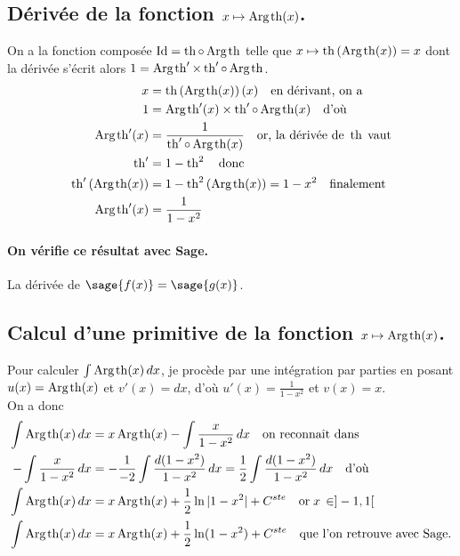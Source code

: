 \documentclass[a4paper,12pt]{report}
\def\Id{\ensuremath{\mathrm{Id}}}
\renewcommand{\tanh}{\mathop{\mathrm{th}}}
\renewcommand{\arg}{\mathop{\mathrm{Arg}}}
\begin{document}
\subsection{Dérivée de la fonction $x \mapsto \arg\mspace{-1mu}\tanh(x)$.}
On a la fonction composée $\Id = \tanh \circ \arg\mspace{-1mu}\tanh$ telle que $x\mapsto\tanh\left(\arg\mspace{-1mu}\tanh(x)\right)=x$ dont la dérivée s'écrit alors $1= \arg\mspace{-1mu}\tanh\nolimits' \times \tanh\nolimits'\circ\arg\mspace{-1mu}\tanh$.
\begin{align*}
x & =\tanh\left(\arg\mspace{-1mu}\tanh(x)\right)(x) \quad \textrm{en dérivant, on a}\\
1 & = \arg\mspace{-1mu}\tanh\nolimits'(x) \times \tanh\nolimits'\circ\arg\mspace{-1mu}\tanh(x) \quad \textrm{d'où}\\
\arg\mspace{-1mu}\tanh\nolimits'(x) & =\frac{1}{ \tanh\nolimits'\circ\arg\mspace{-1mu}\tanh(x)}\quad \textrm{or, la dérivée de } \tanh \; \textrm{vaut}\\
\tanh\nolimits' & = 1-\tanh\nolimits^2 \quad \textrm{donc} \\
\tanh\nolimits'\left(\arg\mspace{-1mu}\tanh(x)\right) & = 1 - \tanh\nolimits^2 \left(\arg\mspace{-1mu}\tanh(x)\right) = 1 - x^2 \quad \textrm{finalement}\\
\arg\mspace{-1mu}\tanh\nolimits'(x) & = \frac{1}{ 1- x^2} 
\end{align*}
\paragraph{On vérifie ce résultat avec Sage.}
La dérivée de $\sage{f(x)} = \sage{g(x)} $.


\subsection{Calcul d'une primitive de la fonction  $x \mapsto \arg\mspace{-1mu}\tanh(x)$.}

Pour calculer $\int \arg\mspace{-1mu}\tanh(x) \, dx$, je procède par une intégration par parties en posant $u(x) = \arg\mspace{-1mu}\tanh(x)$ et $v'(x) = dx$, d'où $u'(x) = \frac{1}{ 1 - x^2 }$ et $ v(x) = x $. \\
On a donc
\begin{align*}
\int \arg\mspace{-1mu}\tanh(x) \, dx & = x \arg\mspace{-1mu}\tanh(x) - \int  \frac{x}{ 1 - x^2 } \, dx \quad \textrm{on reconnaît dans}\\
- \int  \frac{x}{ 1 - x^2 } \, dx & = -\frac{1}{-2} \int  \frac{d(1 - x^2 )}{ 1 - x^2 } \, dx = \frac{1}{2} \int  \frac{d(1 - x^2 )}{ 1 - x^2 } \, dx  \quad \textrm{d'où}\\
\int \arg\mspace{-1mu}\tanh(x) \, dx & = x \arg\mspace{-1mu}\tanh(x) + \frac{1}{2} \ln|1- x^2| + C^{ste} \quad \textrm{or} \; x \, \in ]-1, 1[ \\
\int \arg\mspace{-1mu}\tanh(x) \, dx & = x \arg\mspace{-1mu}\tanh(x) + \frac{1}{2} \ln(1- x^2) + C^{ste} \quad \textrm{que l'on retrouve avec Sage.}
\end{align*}
\end{document}
